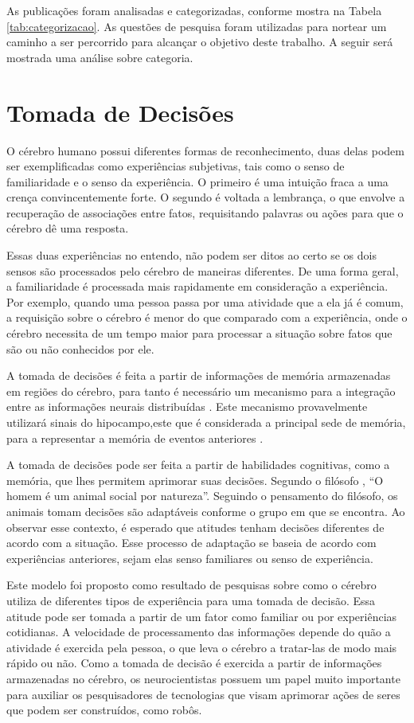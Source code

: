 As publicações foram analisadas e categorizadas, conforme mostra na Tabela \ref{tab:categorizacao}. As questões de pesquisa foram utilizadas para nortear um caminho a ser percorrido para alcançar o objetivo deste trabalho. A seguir será mostrada uma análise sobre categoria.

\section{Tomada de Decisões}

O cérebro humano possui diferentes formas de reconhecimento, duas delas podem ser exemplificadas como experiências subjetivas, tais como o senso de familiaridade e o senso da experiência. O primeiro é uma intuição fraca a uma crença convincentemente forte. O segundo é voltada a lembrança, o que envolve a recuperação de associações entre fatos, requisitando palavras ou ações para que o cérebro dê uma resposta.

Essas duas experiências no entendo, não podem ser ditos ao certo se os dois sensos são processados pelo cérebro de maneiras diferentes. De uma forma geral, a familiaridade é processada mais rapidamente em consideração a experiência. Por exemplo, quando uma pessoa passa por uma atividade que a ela já é comum, a requisição sobre o cérebro é menor do que comparado com a experiência, onde o cérebro necessita de um tempo maior para processar a situação sobre fatos que são ou não conhecidos por ele. 

A tomada de decisões é feita a partir de informações de memória armazenadas em regiões do cérebro, para tanto é necessário um mecanismo para a integração entre as informações neurais distribuídas \cite{buzsaki}. Este mecanismo provavelmente utilizará sinais do hipocampo,este que é considerada a principal sede de memória, para a representar a memória de eventos anteriores \cite{eichenbaum}.

A tomada de decisões pode ser feita a partir de habilidades cognitivas, como a memória, que lhes permitem aprimorar suas decisões. Segundo o filósofo \cite{aristoteles}, “O homem é um animal social por natureza”. Seguindo o pensamento do filósofo, os animais tomam decisões são adaptáveis conforme o grupo em que se encontra. Ao observar esse contexto, é esperado que atitudes tenham decisões diferentes de acordo com a situação. Esse processo de adaptação se baseia de acordo com experiências anteriores, sejam elas senso familiares ou senso de experiência.

Este modelo foi proposto como resultado de pesquisas sobre como o cérebro utiliza de diferentes tipos de experiência para uma tomada de decisão. Essa atitude pode ser tomada a partir de um fator como familiar ou por experiências cotidianas. A velocidade de processamento das informações depende do quão a atividade é exercida pela pessoa, o que leva o cérebro a tratar-las de modo mais rápido ou não. Como a tomada de decisão é exercida a partir de informações armazenadas no cérebro, os neurocientistas possuem um papel muito importante para auxiliar os pesquisadores de tecnologias que visam aprimorar ações de seres que podem ser construídos, como robôs.

